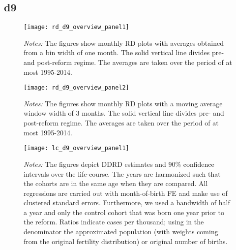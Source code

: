 \subsection{d9}
\begin{landscape}
\begin{figure}[H]
	\centering
	\begin{minipage}{.95\linewidth}
	\texttt{[image: rd\_d9\_overview\_panel1]}
	{\scriptsize \emph{Notes:} The figures show monthly RD plots with averages obtained from a bin width of one month. The solid vertical line divides pre- and post-reform regime. The averages are taken over the period of at most 1995-2014. \par}
\end{minipage}
\end{figure}
\end{landscape}
\begin{landscape}
\begin{figure}[H]
	\centering
\begin{minipage}{.95\linewidth}
	\texttt{[image: rd\_d9\_overview\_panel2]}
	{\scriptsize \emph{Notes:} The figures show monthly RD plots with a moving average window width of 3 months. The solid vertical line divides pre- and post-reform regime. The averages are taken over the period of at most 1995-2014. \par}
\end{minipage}
\end{figure}
\end{landscape}


\begin{landscape}
\begin{figure}[H]
\centering
\begin{minipage}{.9\linewidth}
\texttt{[image: lc\_d9\_overview\_panel1]}
{\scriptsize \emph{Notes:} The figures depict DDRD estimates and 90\% confidence intervals over the life-course. The years are harmonized such that the cohorts are in the same age when they are compared. All regressions are carried out with month-of-birth FE and make use of clustered standard errors. Furthermore, we used a bandwidth of half a year and only the control cohort that was born one year prior to the reform. Ratios indicate cases per thousand; using in the denominator the approximated population (with weights coming from the original fertility distribution) or original number of births. \par}
\end{minipage}
\end{figure}
\end{landscape}
